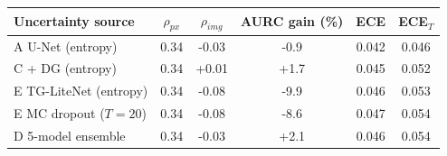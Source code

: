 \begin{tabular}{lccccc}
\toprule
Uncertainty source & $\rho_{px}$ & $\rho_{img}$ & AURC gain (\%) & ECE & ECE$_T$ \\
\midrule
A  U-Net (entropy) & 0.34 & -0.03 & -0.9 & 0.042 & 0.046 \\
C  + DG (entropy) & 0.34 & +0.01 & +1.7 & 0.045 & 0.052 \\
E  TG-LiteNet (entropy) & 0.34 & -0.08 & -9.9 & 0.046 & 0.053 \\
E  MC dropout ($T{=}20$) & 0.34 & -0.08 & -8.6 & 0.047 & 0.054 \\
D  5-model ensemble & 0.34 & -0.03 & +2.1 & 0.046 & 0.054 \\
\bottomrule
\end{tabular}